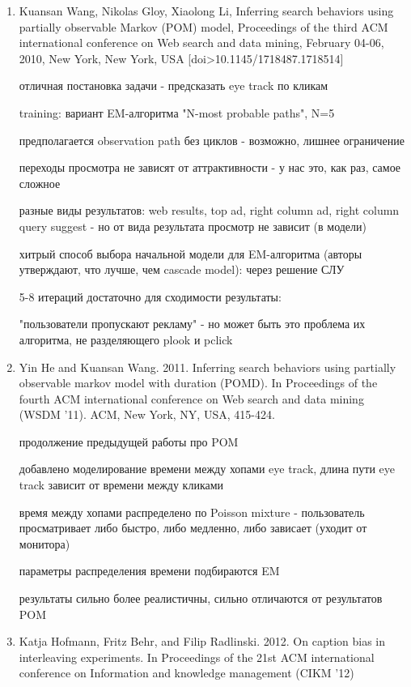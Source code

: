 \documentclass[12pt,a4paper]{article}
\begin{document}
\begin{enumerate}

\item Kuansan Wang, Nikolas Gloy, Xiaolong Li, Inferring search behaviors using partially observable Markov (POM) model, Proceedings of the third ACM international conference on Web search and data mining, February 04-06, 2010, New York, New York, USA  [doi>10.1145/1718487.1718514]

  отличная постановка задачи - предсказать eye track по кликам

  training: вариант EM-алгоритма "N-most probable paths", N=5

    предполагается observation path без циклов - возможно, лишнее ограничение

	переходы просмотра не зависят от аттрактивности - у нас это, как раз, самое сложное

	разные виды результатов: web results, top ad, right column ad, right column query suggest - но от вида результата просмотр не зависит (в модели)

    хитрый способ выбора начальной модели для EM-алгоритма (авторы утверждают, что лучше, чем cascade model): через решение СЛУ

	5-8 итераций достаточно для сходимости
  результаты:

    "пользователи пропускают рекламу" - но может быть это проблема их алгоритма, не разделяющего plook и pclick

\item Yin He and Kuansan Wang. 2011. Inferring search behaviors using partially observable markov model with duration (POMD). In Proceedings of the fourth ACM international conference on Web search and data mining (WSDM '11). ACM, New York, NY, USA, 415-424.

  продолжение предыдущей работы про POM

  добавлено моделирование времени между хопами eye track, длина пути eye track зависит от времени между кликами

  время между хопами распределено по Poisson mixture - пользователь просматривает либо быстро, либо медленно, либо зависает (уходит от монитора)

  параметры распределения времени подбираются EM

  результаты сильно более реалистичны, сильно отличаются от результатов POM

\item Katja Hofmann, Fritz Behr, and Filip Radlinski. 2012. On caption bias in interleaving experiments. In Proceedings of the 21st ACM international conference on Information and knowledge management (CIKM '12)


\end{enumerate}
\end{document}
